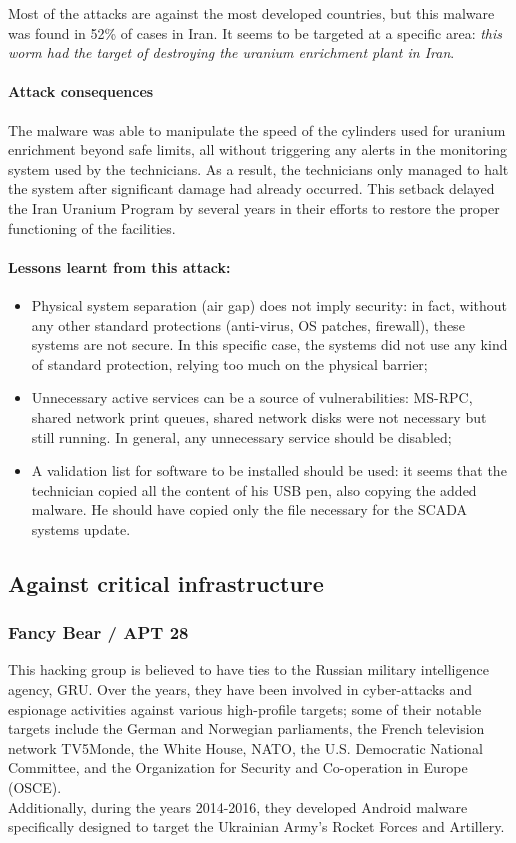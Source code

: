 Most of the attacks are against the most developed countries, but this malware was found in 52\% of cases in Iran. It seems to be targeted at a specific area: \emph{this worm had the target of destroying the uranium enrichment plant in Iran}.

\paragraph*{Attack consequences}
The malware was able to manipulate the speed of the cylinders used for uranium enrichment beyond safe limits, all without triggering any alerts in the monitoring system used by the technicians. As a result, the technicians only managed to halt the system after significant damage had already occurred. This setback delayed the Iran Uranium Program by several years in their efforts to restore the proper functioning of the facilities.


\paragraph*{Lessons learnt from this attack:}
\begin{itemize}
  \item Physical system separation (air gap) does not imply security: in fact, without any other standard protections (anti-virus, OS patches, firewall), these systems are not secure. In this specific case, the systems did not use any kind of standard protection, relying too much on the physical barrier;
  \item Unnecessary active services can be a source of vulnerabilities: MS-RPC, shared network print queues, shared network disks were not necessary but still running. In general, any unnecessary service should be disabled;
  \item A validation list for software to be installed should be used: it seems that the technician copied all the content of his USB pen, also copying the added malware. He should have copied only the file necessary for the SCADA systems update.
\end{itemize}



\subsection{Against critical infrastructure}

\subsubsection*{Fancy Bear / APT 28}
This hacking group is believed to have ties to the Russian military intelligence agency, GRU. Over the years, they have been involved in cyber-attacks and espionage activities against various high-profile targets; some of their notable targets include the German and Norwegian parliaments, the French television network TV5Monde, the White House, NATO, the U.S. Democratic National Committee, and the Organization for Security and Co-operation in Europe (OSCE). \\
Additionally, during the years 2014-2016, they developed Android malware specifically designed to target the Ukrainian Army's Rocket Forces and Artillery.


